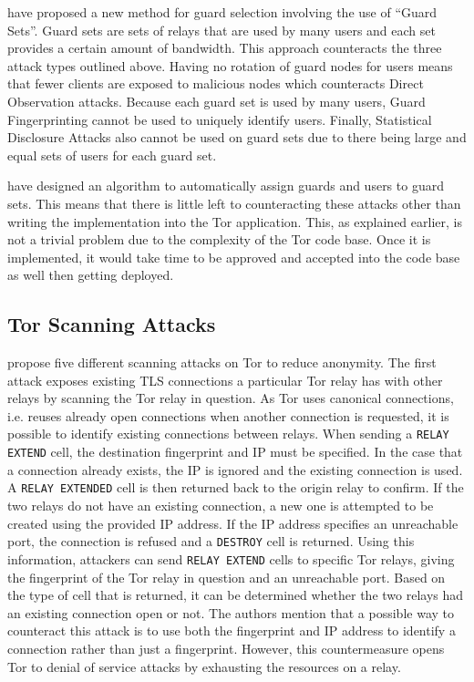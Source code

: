 \documentclass[9pt,technote]{IEEEtran}
\begin{document}
\citeauthor{hayesguard} have proposed a new method for guard selection involving the use of ``Guard Sets''. Guard sets are sets of relays that are used by many users and each set provides a certain amount of bandwidth. This approach counteracts the three attack types outlined above. Having no rotation of guard nodes for users means that fewer clients are exposed to malicious nodes which counteracts Direct Observation attacks. Because each guard set is used by many users, Guard Fingerprinting cannot be used to uniquely identify users. Finally, Statistical Disclosure Attacks also cannot be used on guard sets due to there being large and equal sets of users for each guard set.

\citeauthor{hayesguard} have designed an algorithm to automatically assign guards and users to guard sets. This means that there is little left to counteracting these attacks other than writing the implementation into the Tor application. This, as explained earlier, is not a trivial problem due to the complexity of the Tor code base. Once it is implemented, it would take time to be approved and accepted into the code base as well then getting deployed.

\subsection{Tor Scanning Attacks}
\citeauthor{biryukov2012torscan} propose five different scanning attacks on Tor to reduce anonymity. The first attack exposes existing TLS connections a particular Tor relay has with other relays by scanning the Tor relay in question. As Tor uses canonical connections, i.e. reuses already open connections when another connection is requested, it is possible to identify existing connections between relays. When sending a \texttt{RELAY EXTEND} cell, the destination fingerprint and IP must be specified. In the case that a connection already exists, the IP is ignored and the existing connection is used. A \texttt{RELAY EXTENDED} cell is then returned back to the origin relay to confirm. If the two relays do not have an existing connection, a new one is attempted to be created using the provided IP address. If the IP address specifies an unreachable port, the connection is refused and a \texttt{DESTROY} cell is returned. Using this information, attackers can send \texttt{RELAY EXTEND} cells to specific Tor relays, giving the fingerprint of the Tor relay in question and an unreachable port. Based on the type of cell that is returned, it can be determined whether the two relays had an existing connection open or not. The authors mention that a possible way to counteract this attack is to use both the fingerprint and IP address to identify a connection rather than just a fingerprint. However, this countermeasure opens Tor to denial of service attacks by exhausting the resources on a relay.\\
\end{document}
